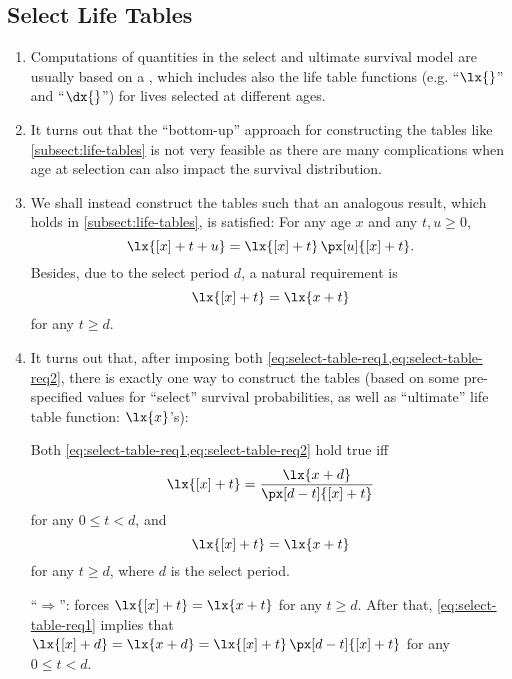 \subsection{Select Life Tables}
\begin{enumerate}
\item Computations of quantities in the select and ultimate survival model are
usually based on a , which includes also the life table
functions (e.g. ``\(\lx{}\)'' and ``\(\dx{}\)'') for lives selected at
different ages.
\item It turns out that the ``bottom-up'' approach for constructing the tables
like \cref{subsect:life-tables} is not very feasible as there are many
complications when age at selection can also impact the survival distribution.
\item We shall instead construct the tables such that an analogous result,
which holds in \cref{subsect:life-tables}, is satisfied: For any age \(x\)
and any \(t,u\ge 0\),
\begin{equation}
\label{eq:select-table-req1}
\lx{[x]+t+u}=\lx{[x]+t}\,\px[u]{[x]+t}.
\end{equation}
Besides, due to the select period \(d\), a natural requirement is
\begin{equation}
\label{eq:select-table-req2}
\lx{[x]+t}=\lx{x+t}
\end{equation}
for any \(t\ge d\).

\item It turns out that, after imposing both
\cref{eq:select-table-req1,eq:select-table-req2}, there is exactly one way to
construct the tables (based on some pre-specified values for ``select''
survival probabilities, as well as ``ultimate'' life table function:
\(\lx{x}\)'s):
\begin{proposition}
\label{prp:construct-select-table}
Both \cref{eq:select-table-req1,eq:select-table-req2} hold true iff
\[
\lx{[x]+t}=\frac{\lx{x+d}}{\px[d-t]{[x]+t}}
\]
for any \(0\le t< d\), and
\[
\lx{[x]+t}=\lx{x+t}
\]
for any \(t\ge d\), where \(d\) is the select period.
\end{proposition}
\begin{pf}
``\(\Rightarrow\)'':  forces \(\lx{[x]+t}=\lx{x+t}\)
for any \(t\ge d\). After that, \cref{eq:select-table-req1} implies that
\(\lx{[x]+d}=\lx{x+d}=\lx{[x]+t}\,\px[d-t]{[x]+t}\) for any \(0\le t<d\).


\end{pf}
\end{enumerate}
